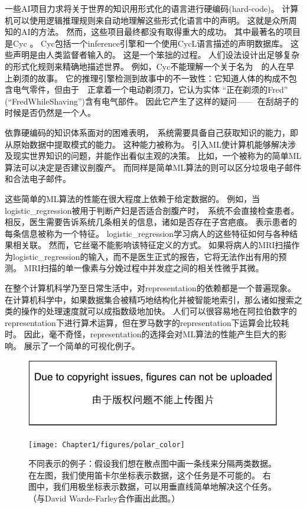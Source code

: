 一些\gls{AI}项目力求将关于世界的知识用形式化的语言进行硬编码(hard-code)。
计算机可以使用逻辑推理规则来自动地理解这些形式化语言中的声明。
这就是众所周知的\gls{AI}的方法。
然而，这些项目最终都没有取得重大的成功。
其中最著名的项目是Cyc \citep{Lenat-1989-book}。
Cyc包括一个\gls{inference}引擎和一个使用CycL语言描述的声明数据库。
这些声明是由人类监督者输入的。
这是一个笨拙的过程。
人们设法设计出足够复杂的形式化规则来精确地描述世界。
例如，Cyc不能理解一个关于名为~~的人在早上剃须的故事\citep{MachineChangedWorld}。
它的推理引擎检测到故事中的不一致性：它知道人体的构成不包含电气零件，但由于~~正拿着一个电动剃须刀，它认为实体
``正在剃须的Fred''\,(``FredWhileShaving'')含有电气部件。
因此它产生了这样的疑问——~在刮胡子的时候是否仍然是一个人。

依靠硬编码的知识体系面对的困难表明，~系统需要具备自己获取知识的能力，即从原始数据中提取模式的能力。
这种能力被称为。
引入\gls{ML}使计算机能够解决涉及现实世界知识的问题，并能作出看似主观的决策。
比如，一个被称为的简单\gls{ML}算法可以决定是否建议剖腹产\citep{MorYosef90}。
而同样是简单\gls{ML}算法的则可以区分垃圾电子邮件和合法电子邮件。


这些简单的\gls{ML}算法的性能在很大程度上依赖于给定数据的。
例如，当\gls{logistic_regression}被用于判断产妇是否适合剖腹产时，~系统不会直接检查患者。
相反，医生需要告诉系统几条相关的信息，诸如是否存在子宫疤痕。
表示患者的每条信息被称为一个特征。
\gls{logistic_regression}学习病人的这些特征如何与各种结果相关联。
然而，它丝毫不能影响该特征定义的方式。
如果将病人的MRI扫描作为\gls{logistic_regression}的输入，而不是医生正式的报告，它将无法作出有用的预测。
MRI扫描的单一像素与分娩过程中并发症之间的相关性微乎其微。

在整个计算机科学乃至日常生活中，对\gls{representation}的依赖都是一个普遍现象。
在计算机科学中，如果数据集合被精巧地结构化并被智能地索引，那么诸如搜索之类的操作的处理速度就可以成指数级地加快。
人们可以很容易地在阿拉伯数字的\gls{representation}下进行算术运算，但在罗马数字的\gls{representation}下运算会比较耗时。
因此，毫不奇怪，\gls{representation}的选择会对\gls{ML}算法的性能产生巨大的影响。
展示了一个简单的可视化例子。

\begin{figure}[!htb]
\ifOpenSource
\centerline{\includegraphics{figure.pdf}}
\else
\centerline{\texttt{[image: Chapter1/figures/polar\_color]}}
\fi
\caption{不同表示的例子：假设我们想在散点图中画一条线来分隔两类数据。
在左图，我们使用笛卡尔坐标表示数据，这个任务是不可能的。 
右图中，我们用极坐标表示数据，可以用垂直线简单地解决这个任务。（与David Warde-Farley合作画出此图。）}
\label{fig:chap1_polar}
\end{figure}

